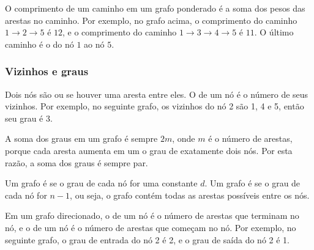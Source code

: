 O comprimento de um caminho em um grafo ponderado é a soma dos pesos das arestas no caminho. Por exemplo, no grafo acima, o comprimento do caminho
$1 \rightarrow 2 \rightarrow 5$ é $12$,
e o comprimento do caminho
$1 \rightarrow 3 \rightarrow 4 \rightarrow 5$ é $11$.
O último caminho é o  do nó $1$ ao nó $5$.

\subsubsection{Vizinhos e graus}


Dois nós são  ou  se houver uma aresta entre eles. O  de um nó é o número de seus vizinhos. Por exemplo, no seguinte grafo, os vizinhos do nó 2 são 1, 4 e 5, então seu grau é 3.

\begin{center}
\end{center}

A soma dos graus em um grafo é sempre $2m$, onde $m$ é o número de arestas, porque cada aresta aumenta em um o grau de exatamente dois nós. Por esta razão, a soma dos graus é sempre par.


Um grafo é  se o grau de cada nó for uma constante $d$. Um grafo é  se o grau de cada nó for $n-1$, ou seja, o grafo contém todas as arestas possíveis entre os nós.


Em um grafo direcionado, o  de um nó é o número de arestas que terminam no nó, e o  de um nó é o número de arestas que começam no nó. Por exemplo, no seguinte grafo, o grau de entrada do nó 2 é 2, e o grau de saída do nó 2 é 1.


